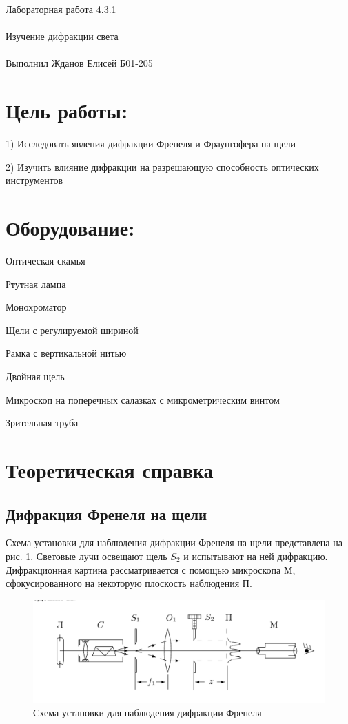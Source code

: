 \documentclass{astroedu-lab}
\begin{document}
\pagestyle{plain}

\begin{problem}{\huge Лабораторная работа 4.3.1\\\\Изучение дифракции света\\\\Выполнил Жданов Елисей Б01-205}

\section{Цель работы:}

1) Исследовать явления дифракции Френеля и Фраунгофера на щели

2) Изучить влияние дифракции на разрешающую способность оптических инструментов

\section{Оборудование:}

Оптическая скамья

Ртутная лампа  

Монохроматор

Щели с регулируемой шириной

Рамка с вертикальной нитью

Двойная щель

Микроскоп на поперечных салазках с микрометрическим винтом

Зрительная труба

\section{Теоретическая справка}

\subsection{Дифракция Френеля на щели}

Схема установки для наблюдения дифракции Френеля на щели представлена на рис. \ref{labA}. Световые лучи освещают щель $ S_2 $ и испытывают на ней дифракцию. Дифракционная картина рассматривается с помощью микроскопа М, сфокусированного на некоторую плоскость наблюдения П.

\begin{figure}[H]
	\centering
	\includegraphics[scale=0.15]{4.3.1/alab.jpeg}
	\caption{Схема установки для наблюдения дифракции Френеля}
	\label{labA}
\end{figure}


\end{problem}
\end{document}
